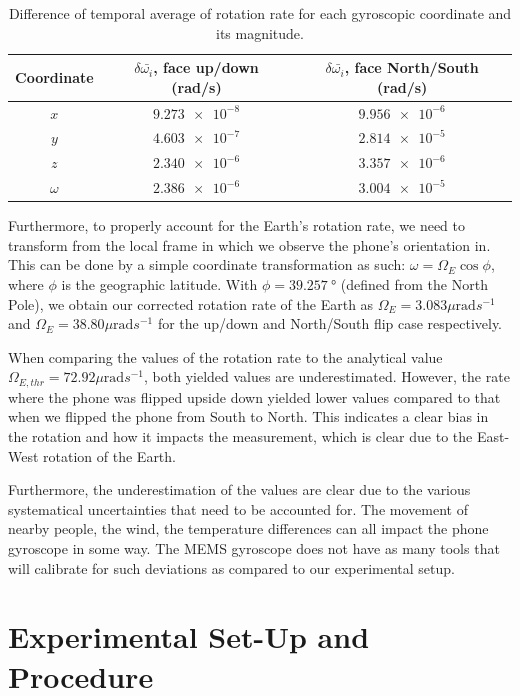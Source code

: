 \documentclass[a4paper]{report}
\numberwithin{equation}{section}
\begin{document}
\begin{table}
\centering
\begin{tabular} {|c|c|c|}
 \hline
 Coordinate & $\delta \bar{\omega_i}$, face up/down (rad/s) & $\delta \bar{\omega_i}$, face North/South (rad/s) \\
 \hline
 $x$ & $\num{9.273e-8}$ & $\num{9.956e-6}$ \\
 \hline
 $y$  & $\num{4.603e-7}$ & $\num{2.814e-5}$ \\
 \hline
 $z$ & $\num{2.340e-6}$ & $\num{3.357e-6}$  \\
 \hline
 $\omega$ & $\num{2.386e-6}$ & $\num{3.004e-5}$ \\
 \hline
\end{tabular}
\caption{Difference of temporal average of rotation rate for each gyroscopic coordinate and its magnitude. }
\label{tab:avg_rate_xyz}
\end{table}
 
Furthermore, to properly account for the Earth's rotation rate, we need to transform from the local frame in which we observe the phone's orientation in.
This can be done by a simple coordinate transformation as such: $\omega = \Omega_E \cos\phi$, where $\phi$ is the geographic latitude.
With $\phi = \SI{39.257}{\degree}$ (defined from the North Pole), we obtain our corrected rotation rate of the Earth as 
$\Omega_E = 3.083\mu \text{rad}s^{-1}$ and $\Omega_E = 38.80\mu \text{rad}s^{-1}$ for the up/down and North/South
flip case respectively.  \par 

When comparing the values of the rotation rate to the analytical value $\Omega_{E, thr} = 72.92\mu \text{rad}s^{-1}$, 
both yielded values are underestimated. However, the rate where the phone was flipped upside down yielded lower values
compared to that when we flipped the phone from South to North. This indicates a clear bias in the rotation and how it 
impacts the measurement, which is clear due to the East-West rotation of the Earth. \par 

Furthermore, the underestimation of the values are clear due to the various systematical uncertainties that need to be accounted for.
The movement of nearby people, the wind, the temperature differences can all impact the phone gyroscope in some way. The 
MEMS gyroscope does not have as many tools that will calibrate for such deviations as compared to our experimental setup. 


\chapter{Experimental Set-Up and Procedure}
\end{document}
